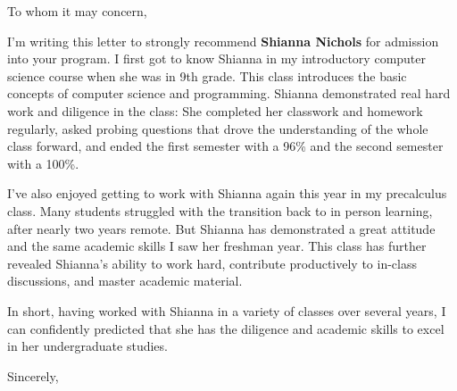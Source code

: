 \documentclass{letter}
\begin{document}
\begin{letter}{}
\opening{To whom it may concern,}

I'm writing this letter to strongly recommend  \textbf{Shianna Nichols} for admission into your program.  I first got to know Shianna in my introductory computer science course when she was in 9th grade.  This class introduces  the basic concepts of computer science and programming. Shianna demonstrated real hard work and diligence in the class: She completed her classwork and homework regularly, asked probing  questions that drove the understanding of the whole class forward, and ended the first semester with a 96\% and the second semester with a 100\%. 

I've also enjoyed getting to work with Shianna again this year in my precalculus class.  Many students struggled with the transition back to in person learning, after nearly two years remote. But Shianna has demonstrated a great attitude and the same academic skills I saw her freshman year.  This class has  further revealed Shianna's ability to work hard, contribute productively to in-class discussions, and master academic material.  

 In short, having worked with Shianna in a variety of classes over several years, I can confidently predicted that she has the diligence and academic skills  to  excel in her undergraduate studies.



\closing{Sincerely,}

\end{letter}
\end{document}
